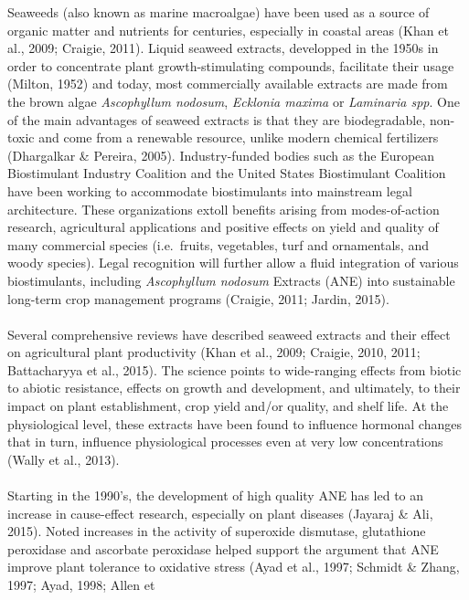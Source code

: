 \documentclass[11pt,]{article}
\begin{document}
Seaweeds (also known as marine macroalgae) have been used as a source of
organic matter and nutrients for centuries, especially in coastal areas
(Khan et al., 2009; Craigie, 2011). Liquid seaweed extracts, developped
in the 1950s in order to concentrate plant growth-stimulating compounds,
facilitate their usage (Milton, 1952) and today, most commercially
available extracts are made from the brown algae \emph{Ascophyllum
nodosum}, \emph{Ecklonia maxima} or \emph{Laminaria spp}. One of the
main advantages of seaweed extracts is that they are biodegradable,
non-toxic and come from a renewable resource, unlike modern chemical
fertilizers (Dhargalkar \& Pereira, 2005). Industry-funded bodies such
as the European Biostimulant Industry Coalition and the United States
Biostimulant Coalition have been working to accommodate biostimulants
into mainstream legal architecture. These organizations extoll benefits
arising from modes-of-action research, agricultural applications and
positive effects on yield and quality of many commercial species
(i.e.~fruits, vegetables, turf and ornamentals, and woody species).
Legal recognition will further allow a fluid integration of various
biostimulants, including \emph{Ascophyllum nodosum} Extracts (ANE) into
sustainable long-term crop management programs (Craigie, 2011; Jardin,
2015).\\
\hspace*{0.333em}\\
Several comprehensive reviews have described seaweed extracts and their
effect on agricultural plant productivity (Khan et al., 2009; Craigie,
2010, 2011; Battacharyya et al., 2015). The science points to
wide-ranging effects from biotic to abiotic resistance, effects on
growth and development, and ultimately, to their impact on plant
establishment, crop yield and/or quality, and shelf life. At the
physiological level, these extracts have been found to influence
hormonal changes that in turn, influence physiological processes even at
very low concentrations (Wally et al., 2013).\\
\hspace*{0.333em}\\
Starting in the 1990's, the development of high quality ANE has led to
an increase in cause-effect research, especially on plant diseases
(Jayaraj \& Ali, 2015). Noted increases in the activity of superoxide
dismutase, glutathione peroxidase and ascorbate peroxidase helped
support the argument that ANE improve plant tolerance to oxidative
stress (Ayad et al., 1997; Schmidt \& Zhang, 1997; Ayad, 1998; Allen et
\end{document}
